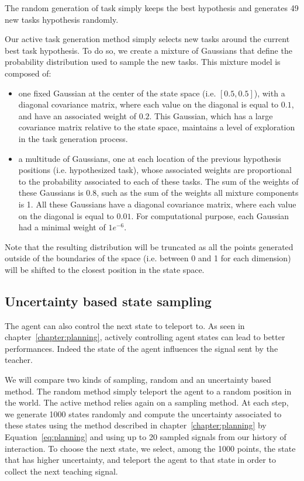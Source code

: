 The random generation of task simply keeps the best hypothesis and generates 49 new tasks hypothesis randomly.

Our active task generation method simply selects new tasks around the current best task hypothesis. To do so, we create a mixture of Gaussians that define the probability distribution used to sample the new tasks. This mixture model is composed of:
\begin{itemize}
\item  one fixed Gaussian at the center of the state space (i.e. $[0.5, 0.5]$), with a diagonal covariance matrix, where each value on the diagonal is equal to $0.1$, and have an associated weight of $0.2$. This Gaussian, which has a large covariance matrix relative to the state space, maintains a level of exploration in the task generation process.
\item a multitude of Gaussians, one at each location of the previous hypothesis positions (i.e. hypothesized task), whose associated weights are proportional to the probability associated to each of these tasks. The sum of the weights of these Gaussians is 0.8, such as the sum of the weights all mixture components is 1. All these Gaussians have a diagonal covariance matrix, where each value on the diagonal is equal to $0.01$. For computational purpose, each Gaussian had a minimal weight of $1e^{-6}$.
\end{itemize}
Note that the resulting distribution will be truncated as all the points generated outside of the boundaries of the space (i.e. between 0 and 1 for each dimension) will be shifted to the closest position in the state space.

\subsection{Uncertainty based state sampling}

The agent can also control the next state to teleport to. As seen in chapter~\ref{chapter:planning}, actively controlling agent states can lead to better performances. Indeed the state of the agent influences the signal sent by the teacher. 

We will compare two kinds of sampling, random and an uncertainty based method. The random method simply teleport the agent to a random position in the world. The active method relies again on a sampling method. At each step, we generate 1000 states randomly and compute the uncertainty associated to these states using the method described in chapter~\ref{chapter:planning} by Equation~\ref{eq:planning} and using up to 20 sampled signals from our history of interaction. To choose the next state, we select, among the 1000 points, the state that has higher uncertainty, and teleport the agent to that state in order to collect the next teaching signal.

